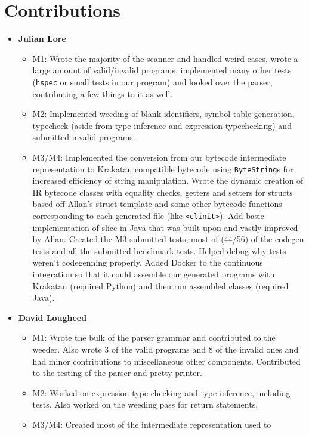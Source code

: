 \documentclass[11pt]{article}
\begin{document}
\section{Contributions}
\begin{itemize}
\item \textbf{Julian Lore}
  \begin{itemize}
  \item M1: Wrote the majority of the scanner and handled weird cases,
    wrote a large amount of valid/invalid programs, implemented many
    other tests (\texttt{hspec} or small tests in our program) and
    looked over the parser, contributing a few things to it as well.
  \item M2: Implemented weeding of blank identifiers, symbol table
    generation, typecheck (aside from type inference and expression
    typechecking) and submitted invalid programs.
  \item M3/M4: Implemented the conversion from our bytecode
    intermediate representation to Krakatau\cite{krakatau} compatible
    bytecode using \texttt{ByteString}s for increased efficiency of
    string manipulation. Wrote the dynamic creation of IR bytecode
    classes with equality checks, getters and setters for structs
    based off Allan's struct template and some other bytecode
    functions corresponding to each generated file (like
    \texttt{<clinit>}). Add basic implementation of slice in Java that
    was built upon and vastly improved by Allan. Created the M3
    submitted tests, most of (44/56) of the codegen tests and all the
    submitted benchmark tests. Helped debug why tests weren't
    codegenning properly. Added Docker to the continuous integration
    so that it could assemble our generated programs with
    Krakatau\cite{krakatau} (required Python) and then run assembled
    classes (required Java).
  \end{itemize}
\item \textbf{David Lougheed}
  \begin{itemize}
  \item M1: Wrote the bulk of the parser grammar and contributed to
    the weeder. Also wrote 3 of the valid programs and 8 of the
    invalid ones and had minor contributions to miscellaneous other
    components.  Contributed to the testing of the parser and pretty
    printer.
  \item M2: Worked on expression type-checking and type inference,
    including tests. Also worked on the weeding pass for return
    statements.
  \item M3/M4: Created most of the intermediate representation used to

\end{itemize}
\end{itemize}
\end{document}
